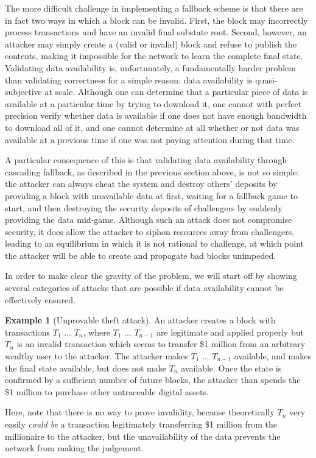 \documentclass[11pt,a4paper]{report}
\theoremstyle{plain}
\theoremstyle{definition}
\newtheorem{exmp}{Example}[section]
\theoremstyle{remark}
\begin{document}
The more difficult challenge in implementing a fallback scheme is that there are in fact two ways in which a block can be invalid. First, the block may incorrectly process transactions and have an invalid final substate root. Second, however, an attacker may simply create a (valid or invalid) block and refuse to publish the contents, making it impossible for the network to learn the complete final state. Validating data availability is, unfortunately, a fundamentally harder problem than validating correctness for a simple reason: data availability is quasi-subjective at scale. Although one can determine that a particular piece of data is available at a particular time by trying to download it, one cannot with perfect precision verify whether data is available if one does not have enough bandwidth to download all of it, and one cannot determine at all whether or not data was available at a previous time if one was not paying attention during that time.

A particular consequence of this is that validating data availability through cascading fallback, as described in the previous section above, is not so simple: the attacker can always cheat the system and destroy others' deposits by providing a block with unavailable data at first, waiting for a fallback game to start, and then destroying the security deposits of challengers by suddenly providing the data mid-game. Although such an attack does not compromise security, it does allow the attacker to siphon resources away from challengers, leading to an equilibrium in which it is not rational to challenge, at which point the attacker will be able to create and propagate bad blocks unimpeded.

In order to make clear the gravity of the problem, we will start off by showing several categories of attacks that are possible if data availability cannot be effectively ensured.

\begin{exmp}[Unprovable theft attack]
An attacker creates a block with transactions $T_1$ ... $T_n$, where $T_1$ ... $T_{n-1}$ are legitimate and applied properly but $T_n$ is an invalid transaction which seems to transfer \$1 million from an arbitrary wealthy user to the attacker. The attacker makes $T_1$ ... $T_{n-1}$ available, and makes the final state available, but does not make $T_n$ available. Once the state is confirmed by a sufficient number of future blocks, the attacker than spends the \$1 million to purchase other untraceable digital assets.

Here, note that there is no way to prove invalidity, because theoretically $T_n$ very easily \emph{could be} a transaction legitimately transferring \$1 million from the millionaire to the attacker, but the unavailability of the data prevents the network from making the judgement.
\end{exmp}
\end{document}
